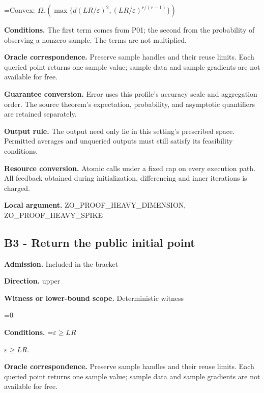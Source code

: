 \documentclass[10pt,a4paper]{article}
\newcommand{\AtlasMath}[1]{\par\begingroup\centering\setbox0=\hbox{$\displaystyle #1$}\ifdim\wd0>1.4\linewidth\typeout{ATLAS WIDE FORMULA: \the\wd0}\fi\ifdim\wd0>\linewidth\resizebox{\linewidth}{!}{\box0}\else\box0\fi\par\endgroup}
\newcommand{\AtlasInlineMath}[1]{\begingroup\setbox0=\hbox{$#1$}\ifdim\wd0>.4\linewidth\endgroup\AtlasMath{#1}\else\endgroup$#1$\fi}
\begin{document}
\AtlasMath{\mathrm{Convex}:\ \Omega_r\!\left(\max\{d(LR/\varepsilon)^2,(LR/\varepsilon)^{r/(r-1)}\}\right)}


\textbf{Conditions.} The first term comes from P01; the second from the probability of observing a nonzero sample. The terms are not multiplied.



\textbf{Oracle correspondence.} Preserve sample handles and their reuse limits. Each queried point returns one sample value; sample data and sample gradients are not available for free.



\textbf{Guarantee conversion.} Error uses this profile's accuracy scale and aggregation order. The source theorem's expectation, probability, and asymptotic quantifiers are retained separately.



\textbf{Output rule.} The output need only lie in this setting's prescribed space. Permitted averages and unqueried outputs must still satisfy its feasibility conditions.



\textbf{Resource conversion.} Atomic calls under a fixed cap on every execution path. All feedback obtained during initialization, differencing and inner iterations is charged.



\textbf{Local argument.} ZO\_PROOF\_HEAVY\_DIMENSION, ZO\_PROOF\_HEAVY\_SPIKE



\subsection{B3 - Return the public initial point}


\textbf{Admission.} Included in the bracket



\textbf{Direction.} upper



\textbf{Witness or lower-bound scope.} Deterministic witness



\AtlasMath{0}


\textbf{Conditions.} \AtlasInlineMath{\varepsilon\ge LR}.



\textbf{Oracle correspondence.} Preserve sample handles and their reuse limits. Each queried point returns one sample value; sample data and sample gradients are not available for free.
\end{document}
